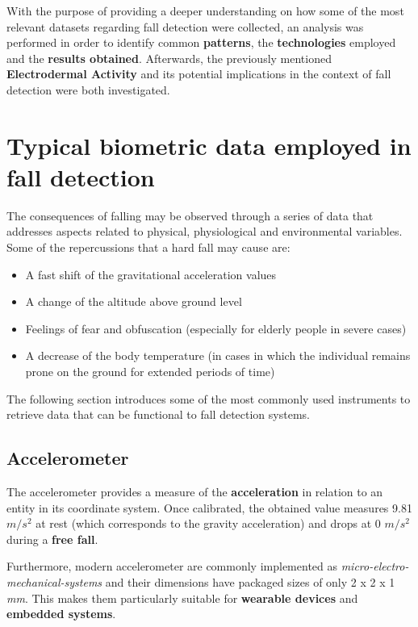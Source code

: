 \label{ch:analysis}

With the purpose of providing a deeper understanding on how some of the most relevant datasets regarding fall detection were collected, an analysis was performed in order to identify common \textbf{patterns}, the \textbf{technologies} employed and the \textbf{results obtained}. Afterwards, the previously mentioned \textbf{Electrodermal Activity} and its potential implications in the context of fall detection were both investigated.

\section{Typical biometric data employed in fall detection}\label{sec:hardware}

The consequences of falling may be observed through a series of data that addresses aspects related to physical, physiological and environmental variables. Some of the repercussions that a hard fall may cause are:

\begin{itemize}
    \item A fast shift of the gravitational acceleration values
    \item A change of the altitude above ground level
    \item Feelings of fear and obfuscation (especially for elderly people in severe cases)
    \item A decrease of the body temperature (in cases in which the individual remains prone on the ground for extended periods of time)
\end{itemize}

The following section introduces some of the most commonly used instruments to retrieve data that can be functional to fall detection systems.

\subsection{Accelerometer}\label{subsec:accelerometer}

The accelerometer provides a measure of the \textbf{acceleration} in relation to an entity in its coordinate system. Once calibrated, the obtained value measures 9.81 $m/s^2$ at rest (which corresponds to the gravity acceleration) and drops at 0 $m/s^2$ during a \textbf{free fall}.

Furthermore, modern accelerometer are commonly implemented as \emph{micro-electro-mechanical-systems} and their dimensions have packaged sizes of only 2 x 2 x 1 \textit{mm}. This makes them particularly suitable for \textbf{wearable devices} and \textbf{embedded systems}.

